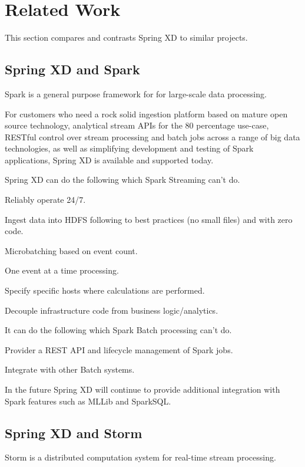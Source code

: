 \section{Related Work}
This section compares and contrasts Spring XD to similar projects.

\subsection{Spring XD and Spark}
Spark is a general purpose framework for for large-scale data processing.

For customers who need a rock solid ingestion platform based on mature open source technology, analytical stream APIs for the 80 percentage use-case, RESTful control over stream processing and batch jobs across a range of big data technologies, as well as simplifying development and testing of Spark applications, Spring XD is available and supported today.

Spring XD can do the following which Spark Streaming can't do.

\begin{itemize*}
\item Reliably operate 24/7.
\item Ingest data into HDFS following to best practices (no small files) and with zero code.
\item Microbatching based on event count.
\item One event at a time processing.
\item Specify specific hosts where calculations are performed.
\item Decouple infrastructure code from business logic/analytics.
\end{itemize*}

It can do the following which Spark Batch processing can't do.

\begin{itemize*}
\item Provider a REST API and lifecycle management of Spark jobs.
\item Integrate with other Batch systems.
\end{itemize*}

In the future Spring XD will continue to provide additional integration with Spark features such as MLLib and SparkSQL.

\subsection{Spring XD and Storm}
Storm is a distributed computation system for real-time stream processing.

